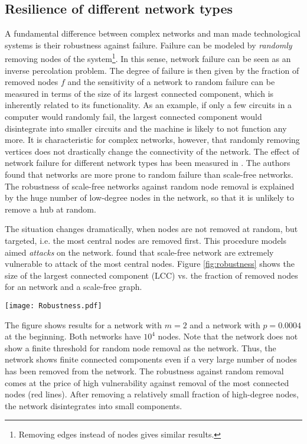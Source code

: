 \subsection{Resilience of different network types}\label{sec:resilience}
A fundamental difference between complex networks and man made technological systems is their robustness against failure.
Failure can be modeled by \emph{randomly} removing nodes of the system\footnote{Removing edges instead of nodes gives similar results.}.
In this sense, network failure can be seen as an inverse percolation problem.
The degree of failure is then given by the fraction of removed nodes $f$ and the sensitivity of a network to random failure can be measured in terms of the size of its largest connected component, which is inherently related to its functionality.
As an example, if only a few circuits in a computer would randomly fail, the largest connected component would disintegrate into smaller circuits and the machine is likely to not function any more.
It is characteristic for complex networks, however, that randomly removing vertices does not drastically change the connectivity of the network.
The effect of network failure for different network types has been measured in \citep{Albert:2000}.
The authors found that \ER networks are more prone to random failure than scale-free networks.
The robustness of scale-free networks against random node removal is explained by the huge number of low-degree nodes in the network, so that it is unlikely to remove a hub at random.

The situation changes dramatically, when nodes are not removed at random, but targeted, i.e. the most central nodes are removed first.
This procedure models aimed \emph{attacks} on the network.
\citeauthor{Albert:2000} found that scale-free network are extremely vulnerable to attack of the most central nodes.
Figure \ref{fig:robustness} shows the size of the largest connected component (LCC) vs. the fraction of removed nodes for an \ER network and a scale-free \BA graph.
%
\begin{SCfigure}
\texttt{[image: Robustness.pdf]}
\caption{Robustness of a \BA  (BA) network and an \ER  (ER) graph to random failure (grey dashed line) and targeted attack (red).
Red lines represent the size of the LCC under targeted removal of the most connected nodes.
The size of the LCC remains finite for the \BA network under random failure even for a large number of removed nodes.
From \citet{Albert:2000}.
}
\label{fig:robustness}
\end{SCfigure}
%
The figure shows results for a \BA network with $m=2$ and a \ER network with $p=0.0004$ at the beginning.
Both networks have $10^4$ nodes.
Note that the \BA network does not show a finite threshold for random node removal as the \ER network.
Thus, the network shows finite connected components even if a very large number of nodes has been removed from the network.
The robustness against random removal comes at the price of high vulnerability against removal of the most connected nodes (red lines).
After removing a relatively small fraction of high-degree nodes, the \BA network disintegrates into small components.

